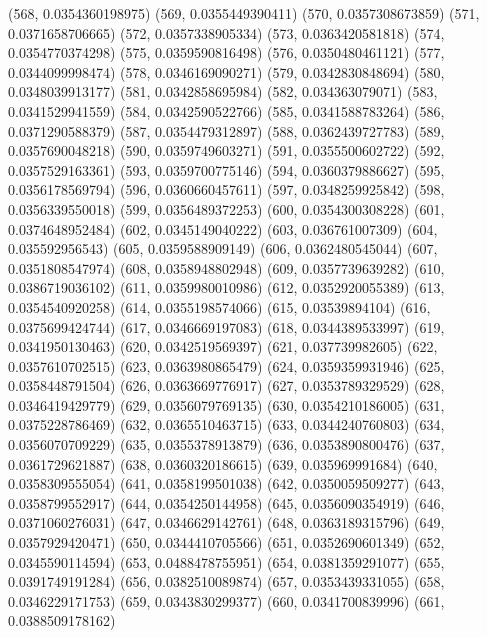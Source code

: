 {					(568, 0.0354360198975)
					(569, 0.0355449390411)
					(570, 0.0357308673859)
					(571, 0.0371658706665)
					(572, 0.0357338905334)
					(573, 0.0363420581818)
					(574, 0.0354770374298)
					(575, 0.0359590816498)
					(576, 0.0350480461121)
					(577, 0.0344099998474)
					(578, 0.0346169090271)
					(579, 0.0342830848694)
					(580, 0.0348039913177)
					(581, 0.0342858695984)
					(582, 0.034363079071)
					(583, 0.0341529941559)
					(584, 0.0342590522766)
					(585, 0.0341588783264)
					(586, 0.0371290588379)
					(587, 0.0354479312897)
					(588, 0.0362439727783)
					(589, 0.0357690048218)
					(590, 0.0359749603271)
					(591, 0.0355500602722)
					(592, 0.0357529163361)
					(593, 0.0359700775146)
					(594, 0.0360379886627)
					(595, 0.0356178569794)
					(596, 0.0360660457611)
					(597, 0.0348259925842)
					(598, 0.0356339550018)
					(599, 0.0356489372253)
					(600, 0.0354300308228)
					(601, 0.0374648952484)
					(602, 0.0345149040222)
					(603, 0.036761007309)
					(604, 0.035592956543)
					(605, 0.0359588909149)
					(606, 0.0362480545044)
					(607, 0.0351808547974)
					(608, 0.0358948802948)
					(609, 0.0357739639282)
					(610, 0.0386719036102)
					(611, 0.0359980010986)
					(612, 0.0352920055389)
					(613, 0.0354540920258)
					(614, 0.0355198574066)
					(615, 0.03539894104)
					(616, 0.0375699424744)
					(617, 0.0346669197083)
					(618, 0.0344389533997)
					(619, 0.0341950130463)
					(620, 0.0342519569397)
					(621, 0.037739982605)
					(622, 0.0357610702515)
					(623, 0.0363980865479)
					(624, 0.0359359931946)
					(625, 0.0358448791504)
					(626, 0.0363669776917)
					(627, 0.0353789329529)
					(628, 0.0346419429779)
					(629, 0.0356079769135)
					(630, 0.0354210186005)
					(631, 0.0375228786469)
					(632, 0.0365510463715)
					(633, 0.0344240760803)
					(634, 0.0356070709229)
					(635, 0.0355378913879)
					(636, 0.0353890800476)
					(637, 0.0361729621887)
					(638, 0.0360320186615)
					(639, 0.035969991684)
					(640, 0.0358309555054)
					(641, 0.0358199501038)
					(642, 0.0350059509277)
					(643, 0.0358799552917)
					(644, 0.0354250144958)
					(645, 0.0356090354919)
					(646, 0.0371060276031)
					(647, 0.0346629142761)
					(648, 0.0363189315796)
					(649, 0.0357929420471)
					(650, 0.0344410705566)
					(651, 0.0352690601349)
					(652, 0.0345590114594)
					(653, 0.0488478755951)
					(654, 0.0381359291077)
					(655, 0.0391749191284)
					(656, 0.0382510089874)
					(657, 0.0353439331055)
					(658, 0.0346229171753)
					(659, 0.0343830299377)
					(660, 0.0341700839996)
					(661, 0.0388509178162)
}
